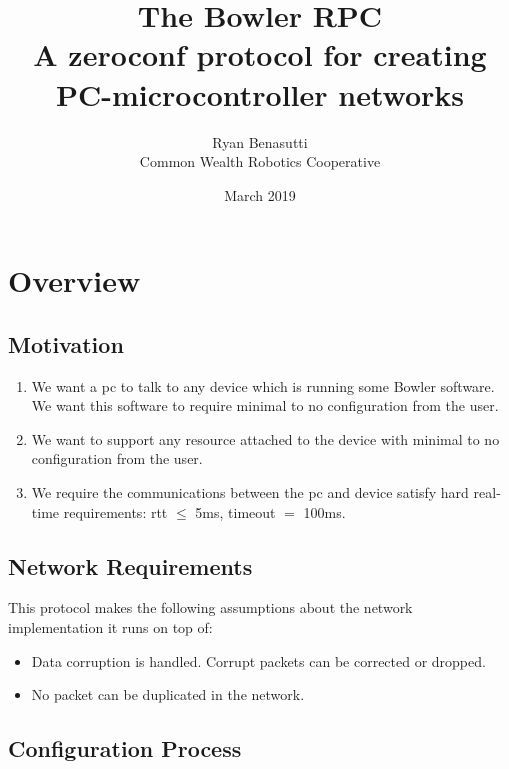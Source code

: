 \documentclass{article}
\title{
    The Bowler RPC \\
    \large A zeroconf protocol for creating PC-microcontroller networks
}
\author{Ryan Benasutti \\ Common Wealth Robotics Cooperative}
\date{March 2019}
\begin{document}
\maketitle

\section{Overview}
\subsection{Motivation}

\begin{enumerate}
    \item We want a \gls{pc} to talk to any \gls{device} which is running some Bowler software. We
    want this software to require minimal to no configuration from the user.
    
    \item We want to support any \gls{resource} attached to the \gls{device} with minimal to no
    configuration from the user.

    \item We require the communications between the \gls{pc} and \gls{device} satisfy hard real-time
    requirements: \gls{rtt} $\leq$ 5ms, timeout $=$ 100ms.
\end{enumerate}

\subsection{Network Requirements}

This protocol makes the following assumptions about the network implementation it runs on top of:
\begin{itemize}
    \item Data corruption is handled. Corrupt packets can be corrected or dropped.

    \item No packet can be duplicated in the network.
\end{itemize}

\subsection{Configuration Process}
\end{document}

